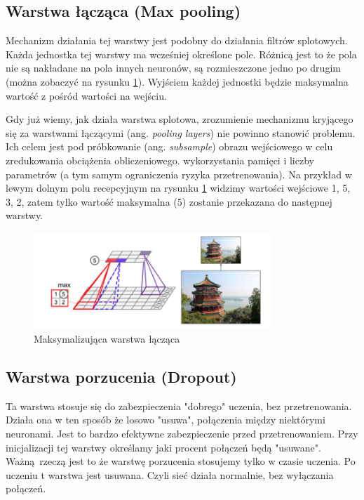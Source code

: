 \documentclass{article}
\begin{document}
\subsection{Warstwa łącząca (Max pooling)}
Mechanizm działania tej warstwy jest podobny do działania filtrów splotowych. Każda jednostka tej warstwy ma wcześniej określone pole. Różnicą jest to że pola nie są nakładane na pola innych neuronów, są rozmieszczone jedno po drugim (można zobaczyć na rysunku \ref{max_pooling}). Wyjściem każdej jednostki będzie maksymalna wartość z pośród wartości na wejściu.

Gdy już wiemy, jak działa warstwa splotowa, zrozumienie mechanizmu kryjącego się za warstwami łączącymi (ang. \textit{pooling layers}) nie powinno stanowić problemu. Ich celem jest pod próbkowanie (ang. \textit{subsample}) obrazu wejściowego w celu zredukowania obciążenia obliczeniowego. wykorzystania pamięci i liczby parametrów (a tym samym ograniczenia ryzyka przetrenowania).
Na przykład w lewym dolnym polu recepcyjnym na rysunku \ref{max_pooling} widzimy wartości wejściowe 1, 5, 3, 2, zatem tylko wartość maksymalna (5) zostanie przekazana do następnej warstwy. \cite{geron}

\begin{figure}[H]
	\centering
	\includegraphics[width=0.8\textwidth,keepaspectratio=true]{max_pooling}
	\caption{Maksymalizująca warstwa łącząca \cite{geron}}
	\label{max_pooling}
\end{figure}


\subsection{Warstwa porzucenia (Dropout)}
Ta warstwa stosuje się do zabezpieczenia "dobrego" uczenia, bez przetrenowania. Działa ona w ten sposób że losowo "usuwa",  połączenia między niektórymi neuronami. Jest to bardzo efektywne zabezpieczenie przed przetrenowaniem. Przy inicjalizacji tej warstwy określamy jaki procent połączeń będą "usuwane". Ważną rzeczą jest to że warstwę porzucenia stosujemy tylko w czasie uczenia. Po uczeniu t warstwa jest usuwana. Czyli sieć działa normalnie, bez wyłączania połączeń. \cite{jak_dziawaja_cnn}
\end{document}

